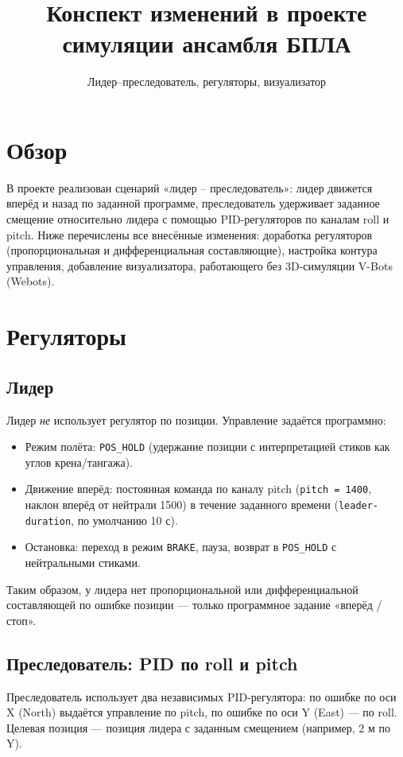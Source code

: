 \documentclass[12pt,a4paper]{article}
\title{Конспект изменений в проекте симуляции ансамбля БПЛА}
\author{Лидер--преследователь, регуляторы, визуализатор}
\date{}
\begin{document}
\maketitle

\section{Обзор}

В проекте реализован сценарий «лидер -- преследователь»: лидер движется вперёд и назад по заданной программе, преследователь удерживает заданное смещение относительно лидера с помощью PID-регуляторов по каналам roll и pitch. Ниже перечислены все внесённые изменения: доработка регуляторов (пропорциональная и дифференциальная составляющие), настройка контура управления, добавление визуализатора, работающего без 3D-симуляции V-Bots (Webots).

\section{Регуляторы}

\subsection{Лидер}

Лидер \emph{не} использует регулятор по позиции. Управление задаётся программно:
\begin{itemize}[noitemsep]
  \item Режим полёта: \texttt{POS\_HOLD} (удержание позиции с интерпретацией стиков как углов крена/тангажа).
  \item Движение вперёд: постоянная команда по каналу pitch (\texttt{pitch = 1400}, наклон вперёд от нейтрали 1500) в течение заданного времени (\texttt{leader-duration}, по умолчанию 10 с).
  \item Остановка: переход в режим \texttt{BRAKE}, пауза, возврат в \texttt{POS\_HOLD} с нейтральными стиками.
\end{itemize}
Таким образом, у лидера нет пропорциональной или дифференциальной составляющей по ошибке позиции --- только программное задание «вперёд / стоп».

\subsection{Преследователь: PID по roll и pitch}

Преследователь использует два независимых PID-регулятора: по ошибке по оси X (North) выдаётся управление по pitch, по ошибке по оси Y (East) --- по roll. Целевая позиция --- позиция лидера с заданным смещением (например, 2 м по Y).
\end{document}

